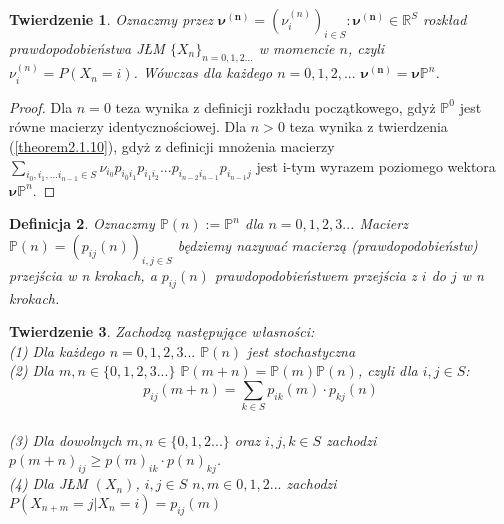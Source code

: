 \documentclass[a4paper]{article}
\theoremstyle{defn}
\newtheorem{defn}{Definicja}[subsection]
\theoremstyle{theorem}
\newtheorem{theorem}[defn]{Twierdzenie}
\theoremstyle{lemma}
\theoremstyle{cor}
\theoremstyle{fact}
\begin{document}
\begin{theorem}\label{theorem2.1.11}
Oznaczmy przez $\boldsymbol{\nu^{(n)}} = (\nu_i^{(n)})_{i \in S}: \boldsymbol{\nu^{(n)}} \in \mathbb{R}^S$ rozkład prawdopodobieństwa JŁM $\{X_n\}_{n = 0,1,2...}$ w momencie $n$, czyli $\nu^{(n)}_i = P(X_n = i)$. Wówczas dla każdego $n= 0,1,2,...$ $\boldsymbol{\nu^{(n)}} = \boldsymbol{\nu} \mathbb{P}^n$.
\end{theorem}
\begin{proof}
Dla $n=0$ teza wynika z definicji rozkładu początkowego, gdyż $\mathbb{P}^0$ jest równe macierzy identycznościowej. Dla $n>0$ teza wynika z twierdzenia (\ref{theorem2.1.10}), gdyż z definicji mnożenia macierzy $\sum\limits_{i_0, i_1,... i_{n-1} \in S} \nu_{i_0} p_{i_{0}i_{1}} p_{i_{1}i_{2}} ... p_{i_{n-2}i_{n-1}}p_{i_{n-1}j}$ jest i-tym wyrazem poziomego wektora $\boldsymbol{\nu} \mathbb{P}^n$.
\end{proof}
\begin{defn}\label{defn2.1.12}
Oznaczmy $\mathbb{P}(n) := \mathbb{P}^n$ dla $n=0,1,2,3..$. Macierz $\mathbb{P}(n) = (p_{ij}(n))_{i, j \in S}$ będziemy nazywać \textit{macierzą (prawdopodobieństw) przejścia w n krokach}, a $p_{ij}(n)$ \textit{prawdopodobieństwem przejścia z $i$ do $j$ w n krokach}.
\end{defn}
\begin{theorem}\label{theorem2.1.13} Zachodzą następujące własności:
\\(1) Dla każdego $n=0,1,2,3...$ $\mathbb{P}(n)$ jest stochastyczna
\\(2) Dla $m,n \in \{0,1,2,3...\}$ $\mathbb{P}(m+n) = \mathbb{P}(m)\mathbb{P}(n)$, czyli dla $i,j \in S$: $$p_{ij}(m+n) = \sum\limits_{k \in S} p_{ik}(m) \cdot p_{kj}(n)$$
\\(3) Dla dowolnych $m,n \in \{0,1,2...\}$ oraz $i,j,k \in S$ zachodzi $p(m+n)_{ij} \geq p(m)_{ik}\cdot p(n)_{kj}$.
\\(4) Dla JŁM $(X_n)$, $i,j \in S$ $n,m \in {0,1,2...}$ zachodzi $P(X_{n+m} = j|X_n = i) = p_{ij}(m)$
\end{theorem}
\end{document}
